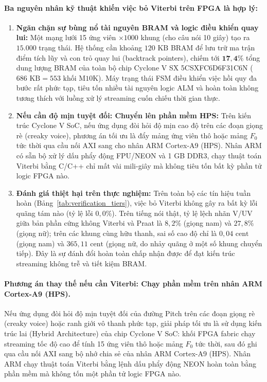 \documentclass[11pt,a4paper]{article}
\begin{document}
\paragraph{Ba nguyên nhân kỹ thuật khiến việc bỏ Viterbi trên FPGA là hợp lý:}
\begin{enumerate}
    \setlength{\itemsep}{1.5pt}
    \item \textbf{Ngăn chặn sự bùng nổ tài nguyên BRAM và logic điều khiển quay lui:} Một mạng lưới 15 ứng viên $\times 1000$ khung (cho câu nói 10 giây) tạo ra $15.000$ trạng thái. Hệ thống cần khoảng $120\text{ KB}$ BRAM để lưu trữ ma trận điểm tích lũy và con trỏ quay lui (backtrack pointers), chiếm tới $\mathbf{17{,}4\%}$ tổng dung lượng BRAM của toàn bộ chip Cyclone V SX 5CSXFC6D6F31C6N ($686\text{ KB} = 553\text{ khối M10K}$). Máy trạng thái FSM điều khiển việc hồi quy đa bước rất phức tạp, tiêu tốn nhiều tài nguyên logic ALM và hoàn toàn không tương thích với luồng xử lý streaming cuốn chiếu thời gian thực.
    \item \textbf{Nếu cần độ mịn tuyệt đối: Chuyển lên phần mềm HPS:} Trên kiến trúc Cyclone V SoC, nếu ứng dụng đòi hỏi độ mịn cao độ trên các đoạn giọng rè (creaky voice), phương án tối ưu là đẩy mảng ứng viên thô hoặc mảng $F_0$ tức thời qua cầu nối AXI sang cho nhân ARM Cortex-A9 (HPS). Nhân ARM có sẵn bộ xử lý dấu phẩy động FPU/NEON và 1 GB DDR3, chạy thuật toán Viterbi bằng C/C++ chỉ mất vài mili-giây mà không tiêu tốn bất kỳ phần tử logic FPGA nào.
    \item \textbf{Đánh giá thiệt hại trên thực nghiệm:} Trên toàn bộ các tín hiệu tuần hoàn (Bảng~\ref{tab:verification_tiers}), việc bỏ Viterbi không gây ra bất kỳ lỗi quãng tám nào (tỷ lệ lỗi $0{,}0\%$). Trên tiếng nói thật, tỷ lệ lệch nhãn V/UV giữa bản phần cứng không Viterbi và Praat là $8{,}2\%$ (giọng nam) và $27{,}8\%$ (giọng nữ); trên các khung cùng hữu thanh, sai số cao độ chỉ là $0{,}04\text{ cent}$ (giọng nam) và $365{,}11\text{ cent}$ (giọng nữ, do nhảy quãng ở một số khung chuyển tiếp). Đây là sự đánh đổi hoàn toàn chấp nhận được để đạt kiến trúc streaming không trễ và tiết kiệm BRAM.
\end{enumerate}

\paragraph{Phương án thay thế nếu cần Viterbi: Chạy phần mềm trên nhân ARM Cortex-A9 (HPS).}
Nếu ứng dụng đòi hỏi độ mịn tuyệt đối của đường Pitch trên các đoạn giọng rè (creaky voice) hoặc ranh giới vô thanh phức tạp, giải pháp tối ưu là sử dụng kiến trúc lai (Hybrid Architecture) của chip Cyclone V SoC:
khối FPGA fabric chạy streaming tốc độ cao để tính 15 ứng viên thô hoặc mảng $F_0$ tức thời, sau đó ghi qua cầu nối AXI sang bộ nhớ chia sẻ của nhân ARM Cortex-A9 (HPS). Nhân ARM chạy thuật toán Viterbi bằng lệnh dấu phẩy động NEON hoàn toàn bằng phần mềm mà không tốn một phần tử logic FPGA nào.
\end{document}
